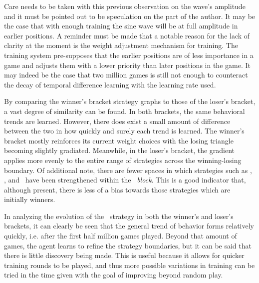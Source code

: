 Care needs to be taken with this previous observation on the wave's amplitude
and it must be pointed out to be speculation on the part of the author.
%
It may be the case that with enough training the sine wave will be at full
amplitude in earlier positions.
%
A reminder must be made that
a notable reason for the lack of clarity at the moment is the weight adjustment
mechanism for training.
%
The training system pre-supposes that the earlier positions are of less
importance in a game and adjusts them with a lower priority than later positions
in the game.
%
It may indeed be the case that two million games is still not enough to
counteract the decay of temporal difference learning with the learning
rate used.





By comparing the winner's bracket strategy graphs to those of the loser's
bracket,
a vast degree of similarity can be found.
%
In both brackets,
the same behavioral trends are learned.
%
However,
there does exist a small amount of difference between the two
in how quickly and surely each trend is learned.
%
The winner's bracket mostly reinforces its current weight choices
with the losing triangle becoming slightly gradiated.
Meanwhile,
in the loser's bracket,
the gradient applies more evenly to the entire range of strategies
across the winning-losing boundary.
%
Of additional note,
there are fewer spaces in which
strategies such as \cribminavg, \peggingmaxavggained, and \peggingminavggiven\ 
have been strengthened within the \handmaxmin\ \textit{block}.
%
This is a good indicator that,
although present,
there is less of a bias towards those strategies which are initially winners.




In analyzing the evolution of the \handmaxavg\ strategy in both the winner's
and loser's brackets,
it can clearly be seen that the general trend of behavior forms
relatively quickly,
i.e. after the first half million games played.
%
Beyond that amount of games,
the agent learns to refine the strategy boundaries,
but it can be said that there is little discovery being made.
%
This is useful because it allows for quicker training rounds to be played,
and thus more possible variations in training can be tried in the time given
with the goal of improving beyond random play.












